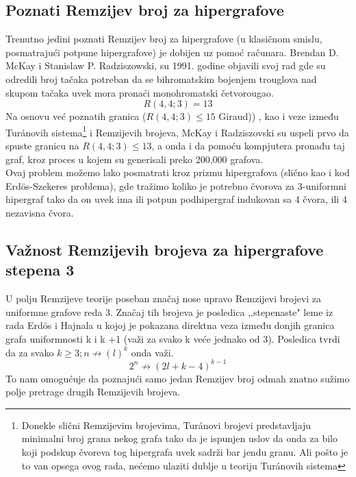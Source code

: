 \documentclass[a4paper]{article}
\begin{document}
	\subsection{Poznati Remzijev broj za hipergrafove}%
	Trenutno jedini poznati Remzijev broj za hipergrafove (u klasičnom smislu, posmatrajući potpune hipergrafove)\cite{pregled}%
	 je dobijen uz pomoć računara. Brendan D. McKay i Stanislaw P. Radziszowski, su 1991. godine objavili svoj rad \textcite{HGremzibroj} gde su odredili broj tačaka potreban da se bihromatskim bojenjem trouglova nad skupom tačaka uvek mora pronaći monohromatski četvorougao.%
	\begin{equation}
		R(4, 4; 3) = 13
	\end{equation}
	Na osnovu već poznatih granica ($R(4, 4; 3) \leq 15$ Giraud))%
	, kao i veze između Tur\'{a}novih sistema\footnote{Donekle slični Remzijevim brojevima, Tur\'{a}novi brojevi predstavljaju minimalni broj grana nekog grafa tako da je ispunjen uslov da onda za bilo koji podskup čvoreva tog hipergrafa uvek sadrži bar jendu granu. Ali pošto je to van opsega ovog rada, nećemo ulaziti dublje u teoriju Tur\'{a}novih sistema } i Remzijevih brojeva, McKay i Radziszovski su uspeli prvo da spuste granicu na $R(4, 4; 3) \leq 13$, a onda i da pomoću kompjutera pronađu taj graf, kroz proces u kojem su generisali preko 200,000 grafova.\\ Ovaj problem možemo lako posmatrati kroz prizmu hipergrafova (slično kao i kod Erd\"{o}s-Szekeres problema), gde tražimo koliko je potrebno čvorova za 3-uniformni hipergraf tako da on uvek ima ili potpun podhipergraf indukovan sa 4 čvora, ili 4  nezavisna čvora. %
	\subsection{Važnost Remzijevih brojeva za hipergrafove stepena 3}
	U polju Remzijeve teorije poseban značaj nose upravo Remzijevi brojevi za uniformne grafove reda 3. Značaj tih brojeva je posledica ‚‚stepenaste" leme iz rada Erd\"{o}s i Hajnala \cite{posledice3remzi} %
	 u kojoj je pokazana direktna veza između donjih granica grafa uniformnosti k i k +1 (važi za svako k veće jednako od 3). Posledica tvrdi da za svako $k \geq 3; n \not\rightarrow (l)^k$ onda važi. \cite{matoraknjigajedvanadjena}
	\begin{equation}
		2^n \not\rightarrow (2l + k - 4)^{k-1}
	\end{equation}
	To nam omogućuje da poznajući samo jedan Remzijev broj odmah znatno sužimo polje pretrage drugih Remzijevih brojeva.
\end{document}
